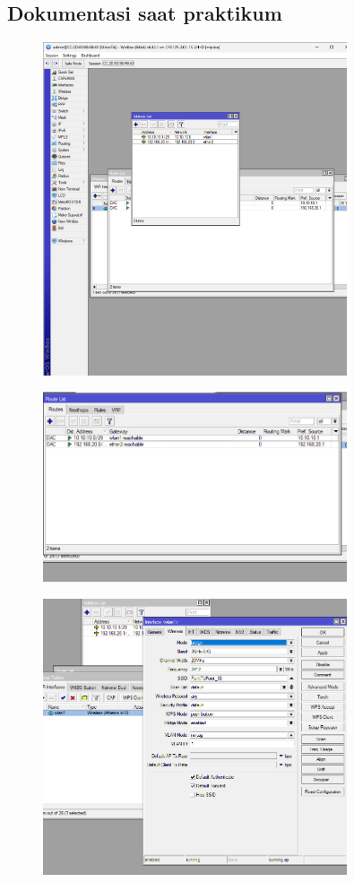 \subsection{Dokumentasi saat praktikum}
\begin{figure}[H]
    \centering
    \includegraphics[width=0.8\textwidth]{P1/img/2.png}
\end{figure}
\begin{figure}[H]
    \centering
    \includegraphics[width=0.8\textwidth]{P1/img/3.png}
\end{figure}
\begin{figure}[H]
    \centering
    \includegraphics[width=0.8\textwidth]{P1/img/4.png}
\end{figure}
